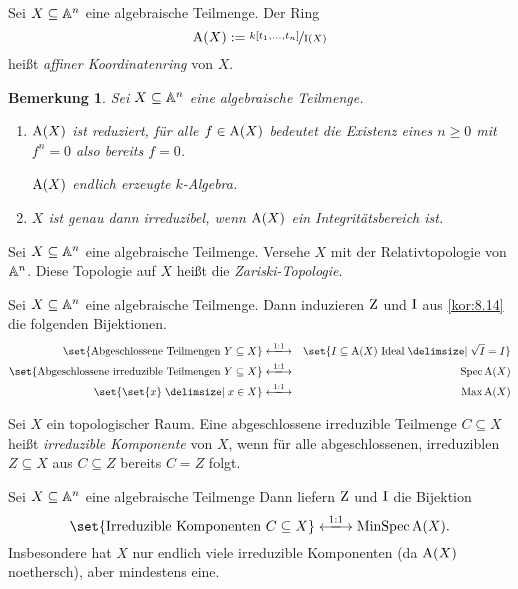\documentclass[12pt,a4paper]{scrartcl}
\theoremstyle{cplain}
\theoremstyle{cdef}
\newtheorem{beme}[thmcounter]{Bemerkung}
\begin{document}
\begin{defi}
	Sei $X\subseteq \mathbb A^n$ eine algebraische Teilmenge. Der Ring
	\[\operatorname{A}(X) := \nicefrac{k[t_1,\dots, t_n]}{\operatorname{I}(X)}\]
	heißt \emph{affiner Koordinatenring} von $X$.
	
\end{defi}
\begin{beme}
	Sei $X\subseteq \mathbb A^n$ eine algebraische Teilmenge.
	\begin{enumerate}
		\item $\operatorname{A}(X)$ ist \emph{reduziert}, für alle $f\in \operatorname{A}(X)$ bedeutet die Existenz eines $n\ge 0$ mit $f^n = 0$ also bereits $f = 0$.
		
		$\operatorname{A}(X)$ endlich erzeugte $k$-Algebra.
		\item $X$ ist genau dann irreduzibel, wenn $\operatorname{A}(X)$ ein Integritätsbereich ist.
	\end{enumerate}
\end{beme}
\begin{defi}
	Sei $X\subseteq \mathbb A^n$ eine algebraische Teilmenge. Versehe $X$ mit der Relativtopologie von $\mathbb A^n$. Diese Topologie auf $X$ heißt die \emph{Zariski-Topologie}.
\end{defi}
\begin{kor}
	Sei $X\subseteq\mathbb A^n$ eine algebraische Teilmenge. Dann induzieren $\operatorname{Z}$ und $\operatorname{I}$ aus \cref{kor:8.14} die folgenden Bijektionen.
	\begin{eqnarray*}
		\set{\text{Abgeschlossene Teilmengen }Y\subseteq X} &\xlongleftrightarrow{1:1}&\set{I\subseteq \A(X) \text{ Ideal}\given \sqrt{I} = I}\\
		\set{\text{Abgeschlossene irreduzible Teilmengen }Y\subseteq X}&\xlongleftrightarrow{1:1}&\Spec \A(X)\\
		\set{\set{x}\given x\in X}&\xlongleftrightarrow{1:1}&\Max \A(X)
	\end{eqnarray*}
\end{kor}
\begin{defi}
	Sei $X$ ein topologischer Raum. Eine abgeschlossene irreduzible Teilmenge $C\subseteq X$ heißt \emph{irreduzible Komponente} von $X$, wenn für alle abgeschlossenen, irreduziblen $Z\subseteq X$ aus $C\subseteq Z$ bereits $C = Z$ folgt.
\end{defi}
\begin{kor}
	Sei $X\subseteq \mathbb A^n$ eine algebraische Teilmenge Dann liefern $\operatorname{Z}$ und $\operatorname{I}$ die Bijektion
	\[\set{\text{Irreduzible Komponenten }C\subseteq X}\xlongleftrightarrow{1:1} \operatorname{MinSpec}\A(X).\]
	Insbesondere hat $X$ nur endlich viele irreduzible Komponenten (da $\operatorname{A}(X)$ noethersch), aber mindestens eine.
\end{kor}
\end{document}

